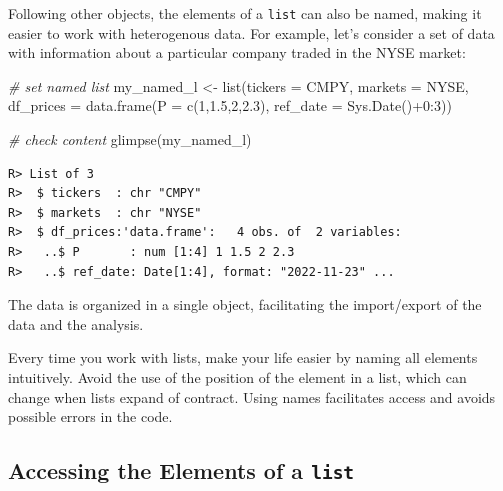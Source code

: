 \documentclass[
  12pt,
]{book}
\newenvironment{Shaded}{\begin{snugshade}}{\end{snugshade}}
\newcommand{\AttributeTok}[1]{\textcolor[rgb]{0.61,0.61,0.61}{#1}}
\newcommand{\CommentTok}[1]{\textcolor[rgb]{0.37,0.37,0.37}{\textit{#1}}}
\newcommand{\DecValTok}[1]{\textcolor[rgb]{0.06,0.06,0.06}{#1}}
\newcommand{\FloatTok}[1]{\textcolor[rgb]{0.06,0.06,0.06}{#1}}
\newcommand{\FunctionTok}[1]{\textcolor[rgb]{0,0,0}{#1}}
\newcommand{\NormalTok}[1]{#1}
\newcommand{\OtherTok}[1]{\textcolor[rgb]{0.37,0.37,0.37}{#1}}
\newcommand{\SpecialCharTok}[1]{\textcolor[rgb]{0,0,0}{#1}}
\newcommand{\StringTok}[1]{\textcolor[rgb]{0.5,0.5,0.5}{#1}}
\newenvironment{rmdimportant}
{\begin{importantblock}
		
	} {\end{importantblock}}
\begin{document}
Following other objects, the elements of a \texttt{list} can also be named, making it easier to work with heterogenous data. For example, let's consider a set of data with information about a particular company traded in the NYSE market:

\begin{Shaded}
\begin{Highlighting}[]
\CommentTok{\# set named list}
\NormalTok{my\_named\_l }\OtherTok{\textless{}{-}} \FunctionTok{list}\NormalTok{(}\AttributeTok{tickers =} \StringTok{\textquotesingle{}CMPY\textquotesingle{}}\NormalTok{,}
                   \AttributeTok{markets =} \StringTok{\textquotesingle{}NYSE\textquotesingle{}}\NormalTok{,}
                   \AttributeTok{df\_prices =} \FunctionTok{data.frame}\NormalTok{(}\AttributeTok{P =} \FunctionTok{c}\NormalTok{(}\DecValTok{1}\NormalTok{,}\FloatTok{1.5}\NormalTok{,}\DecValTok{2}\NormalTok{,}\FloatTok{2.3}\NormalTok{),}
                                          \AttributeTok{ref\_date =} \FunctionTok{Sys.Date}\NormalTok{()}\SpecialCharTok{+}\DecValTok{0}\SpecialCharTok{:}\DecValTok{3}\NormalTok{))}

\CommentTok{\# check content}
\FunctionTok{glimpse}\NormalTok{(my\_named\_l)}
\end{Highlighting}
\end{Shaded}

\begin{verbatim}
R> List of 3
R>  $ tickers  : chr "CMPY"
R>  $ markets  : chr "NYSE"
R>  $ df_prices:'data.frame':   4 obs. of  2 variables:
R>   ..$ P       : num [1:4] 1 1.5 2 2.3
R>   ..$ ref_date: Date[1:4], format: "2022-11-23" ...
\end{verbatim}

The data is organized in a single object, facilitating the import/export of the data and the analysis.

\begin{rmdimportant}
Every time you work with lists, make your life easier by naming all
elements intuitively. Avoid the use of the position of the element in a
list, which can change when lists expand of contract. Using names
facilitates access and avoids possible errors in the code.
\end{rmdimportant}

\hypertarget{accessing-the-elements-of-a-list}{%
\subsection{\texorpdfstring{Accessing the Elements of a \texttt{list}}{Accessing the Elements of a list}}\label{accessing-the-elements-of-a-list}}
\end{document}

